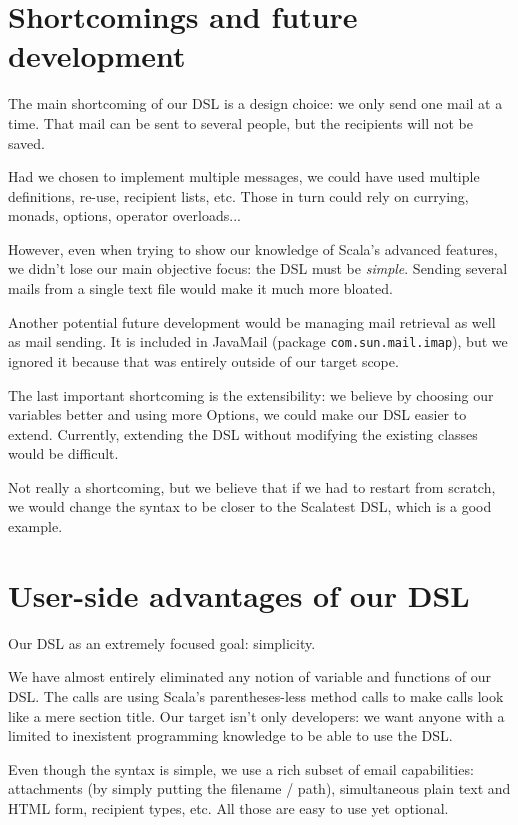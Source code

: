 \documentclass[10pt,a4paper]{article}
\begin{document}
\clearpage

\section{Shortcomings and future development}

	The main shortcoming of our DSL is a design choice: we only send one mail at a time. That mail can be sent to several people, but the recipients will not be saved.
	
	Had we chosen to implement multiple messages, we could have used multiple definitions, re-use, recipient lists, etc. Those in turn could rely on currying, monads, options, operator overloads...
	
	However, even when trying to show our knowledge of Scala's advanced features, we didn't lose our main objective focus: the DSL must be \textit{simple}. Sending several mails from a single text file would make it much more bloated.
	
	\vskip 10pt
	Another potential future development would be managing mail retrieval as well as mail sending. It is included in JavaMail (package \texttt{com.sun.mail.imap}), but we ignored it because that was entirely outside of our target scope.
	
	\vskip 10pt
	The last important shortcoming is the extensibility: we believe by choosing our variables better and using more Options, we could make our DSL easier to extend. Currently, extending the DSL without modifying the existing classes would be difficult.
	
	\vskip 10pt
	Not really a shortcoming, but we believe that if we had to restart from scratch, we would change the syntax to be closer to the Scalatest DSL, which is a good example.

\section{User-side advantages of our DSL}

	Our DSL as an extremely focused goal: simplicity.
	
	We have almost entirely eliminated any notion of variable and functions of our DSL. The calls are using Scala's parentheses-less method calls to make calls look like a mere section title. Our target isn't only developers: we want anyone with a limited to inexistent programming knowledge to be able to use the DSL.
	
	Even though the syntax is simple, we use a rich subset of email capabilities: attachments (by simply putting the filename / path), simultaneous plain text and HTML form, recipient types, etc. All those are easy to use yet optional.
	
\end{document}
